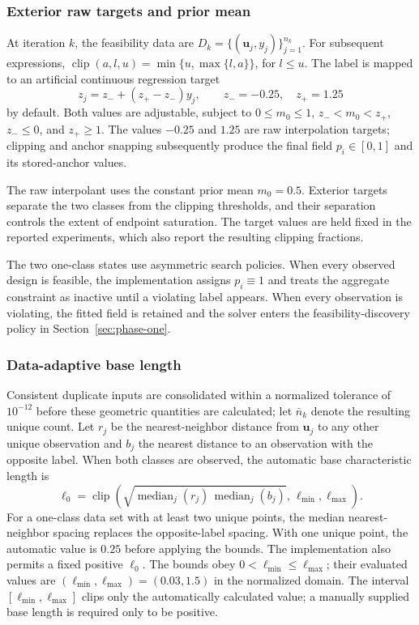 \documentclass[twoside]{article}
\newcommand{\clip}{\operatorname{clip}}
\begin{document}
\subsubsection{Exterior raw targets and prior mean}

At iteration \(k\), the feasibility data are
\(D_k=\{(\mathbf{u}_j,y_j)\}_{j=1}^{n_k}\).
For subsequent expressions,
\(\clip(a,l,u)=\min\{u,\max\{l,a\}\}\), for \(l\leq u\).
The label is mapped to an artificial continuous regression target
\begin{equation}
  z_j=z_-+(z_+-z_-)y_j,
  \qquad z_-=-0.25,\quad z_+=1.25
  \label{eq:raw-targets}
\end{equation}
by default. Both values are adjustable, subject to
\(0\leq m_0\leq1\), \(z_-<m_0<z_+\), \(z_-\leq0\), and
\(z_+\geq1\). The values \(-0.25\) and \(1.25\) are raw interpolation
targets; clipping and anchor snapping subsequently produce the final field
\(p_i\in[0,1]\) and its stored-anchor values.

The raw interpolant uses the constant prior mean \(m_0=0.5\). Exterior targets
separate the two classes from the clipping thresholds, and their separation
controls the extent of endpoint saturation. The target values are held fixed
in the reported experiments, which also report the resulting clipping
fractions.

The two one-class states use asymmetric search policies. When every observed
design is feasible, the implementation assigns \(p_i\equiv1\) and treats the
aggregate constraint as inactive until a violating label appears. When every
observation is violating, the fitted field is retained and the solver enters
the feasibility-discovery policy in Section~\ref{sec:phase-one}.

\subsubsection{Data-adaptive base length}

Consistent duplicate inputs are consolidated within a normalized tolerance of
\(10^{-12}\) before these geometric quantities are calculated; let
\(\bar n_k\) denote the resulting unique
count. Let \(r_j\) be the nearest-neighbor distance from
\(\mathbf{u}_j\) to any other unique observation and \(b_j\) the nearest
distance to an observation with the opposite label.  When both classes are
observed, the automatic base characteristic length is
\begin{equation}
  \ell_0=
  \clip\!\left(
  \sqrt{\operatorname{median}_j(r_j)\,
  \operatorname{median}_j(b_j)},\,
  \ell_{\min},\ell_{\max}\right).
  \label{eq:base-length}
\end{equation}
For a one-class data set with at least two unique points, the median
nearest-neighbor spacing replaces the opposite-label spacing. With one
unique point, the automatic value is \(0.25\) before applying the bounds.  The
implementation also permits a fixed positive \(\ell_0\). The bounds obey
\(0<\ell_{\min}\leq\ell_{\max}\); their evaluated values are
\((\ell_{\min},\ell_{\max})=(0.03,1.5)\) in the normalized domain.
The interval \([\ell_{\min},\ell_{\max}]\) clips only the automatically
calculated value; a manually supplied base length is required only to be
positive.
\end{document}
